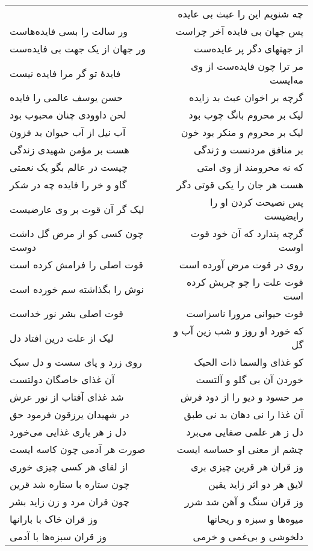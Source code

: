 \begin{center}
\begin{longtable}{l p{0.5cm} r}
&&
چه شنویم این را عبث بی عایده
\\
ور سالت را بسی فایده‌هاست
&&
پس جهان بی فایده آخر چراست
\\
ور جهان از یک جهت بی فایده‌ست
&&
از جهتهای دگر پر عایده‌ست
\\
فایدهٔ تو گر مرا فایده نیست
&&
مر ترا چون فایده‌ست از وی مه‌ایست
\\
حسن یوسف عالمی را فایده
&&
گرچه بر اخوان عبث بد زایده
\\
لحن داوودی چنان محبوب بود
&&
لیک بر محروم بانگ چوب بود
\\
آب نیل از آب حیوان بد فزون
&&
لیک بر محروم و منکر بود خون
\\
هست بر مؤمن شهیدی زندگی
&&
بر منافق مردنست و ژندگی
\\
چیست در عالم بگو یک نعمتی
&&
که نه محرومند از وی امتی
\\
گاو و خر را فایده چه در شکر
&&
هست هر جان را یکی قوتی دگر
\\
لیک گر آن قوت بر وی عارضیست
&&
پس نصیحت کردن او را رایضیست
\\
چون کسی کو از مرض گل داشت دوست
&&
گرچه پندارد که آن خود قوت اوست
\\
قوت اصلی را فرامش کرده است
&&
روی در قوت مرض آورده است
\\
نوش را بگذاشته سم خورده است
&&
قوت علت را چو چربش کرده است
\\
قوت اصلی بشر نور خداست
&&
قوت حیوانی مرورا ناسزاست
\\
لیک از علت درین افتاد دل
&&
که خورد او روز و شب زین آب و گل
\\
روی زرد و پای سست و دل سبک
&&
کو غذای والسما ذات الحبک
\\
آن غذای خاصگان دولتست
&&
خوردن آن بی گلو و آلتست
\\
شد غذای آفتاب از نور عرش
&&
مر حسود و دیو را از دود فرش
\\
در شهیدان یرزقون فرمود حق
&&
آن غذا را نی دهان بد نی طبق
\\
دل ز هر یاری غذایی می‌خورد
&&
دل ز هر علمی صفایی می‌برد
\\
صورت هر آدمی چون کاسه ایست
&&
چشم از معنی او حساسه ایست
\\
از لقای هر کسی چیزی خوری
&&
وز قران هر قرین چیزی بری
\\
چون ستاره با ستاره شد قرین
&&
لایق هر دو اثر زاید یقین
\\
چون قران مرد و زن زاید بشر
&&
وز قران سنگ و آهن شد شرر
\\
وز قران خاک با بارانها
&&
میوه‌ها و سبزه و ریحانها
\\
وز قران سبزه‌ها با آدمی
&&
دلخوشی و بی‌غمی و خرمی

\end{longtable}
\end{center}
